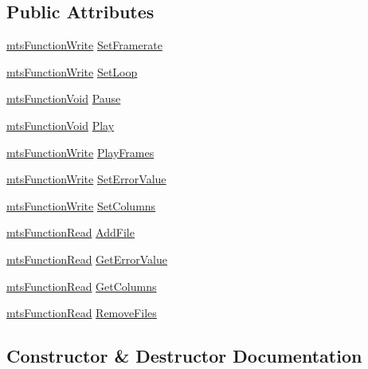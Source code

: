 \subsection*{Public Attributes}
\begin{DoxyCompactItemize}
\item 
\hyperlink{classmts_function_write}{mts\+Function\+Write} \hyperlink{class_i_req_filter_source_text_file_ab2f583e13bb4f0e6019fd749a43efbc7}{Set\+Framerate}
\item 
\hyperlink{classmts_function_write}{mts\+Function\+Write} \hyperlink{class_i_req_filter_source_text_file_a2790141d7cbbd3ff46682e50a558ad6e}{Set\+Loop}
\item 
\hyperlink{classmts_function_void}{mts\+Function\+Void} \hyperlink{class_i_req_filter_source_text_file_a82b790f230892b824fbe402c5b75099b}{Pause}
\item 
\hyperlink{classmts_function_void}{mts\+Function\+Void} \hyperlink{class_i_req_filter_source_text_file_ac79657c22cb873220d37c9f601a0abf6}{Play}
\item 
\hyperlink{classmts_function_write}{mts\+Function\+Write} \hyperlink{class_i_req_filter_source_text_file_a0e25692ad7c4fd99318ad89ec73ab10d}{Play\+Frames}
\item 
\hyperlink{classmts_function_write}{mts\+Function\+Write} \hyperlink{class_i_req_filter_source_text_file_a1bf825ca96ecaba04057138e9ff34a9e}{Set\+Error\+Value}
\item 
\hyperlink{classmts_function_write}{mts\+Function\+Write} \hyperlink{class_i_req_filter_source_text_file_a78889a6dfbb57a0eb6570c66fd8072e6}{Set\+Columns}
\item 
\hyperlink{classmts_function_read}{mts\+Function\+Read} \hyperlink{class_i_req_filter_source_text_file_a20fc10d3d99c9b1ff5b0760d5efa2211}{Add\+File}
\item 
\hyperlink{classmts_function_read}{mts\+Function\+Read} \hyperlink{class_i_req_filter_source_text_file_a5fd360bb1ce42ff97bbcfb7914e3d932}{Get\+Error\+Value}
\item 
\hyperlink{classmts_function_read}{mts\+Function\+Read} \hyperlink{class_i_req_filter_source_text_file_a1824c36d343906140cbf7623ee8a4804}{Get\+Columns}
\item 
\hyperlink{classmts_function_read}{mts\+Function\+Read} \hyperlink{class_i_req_filter_source_text_file_af23d8b705ddd2539be5e5d968c15a5ff}{Remove\+Files}
\end{DoxyCompactItemize}


\subsection{Constructor \& Destructor Documentation}
\hypertarget{class_i_req_filter_source_text_file_aa51f31b7f57a8af34339781df6f05342}{}
